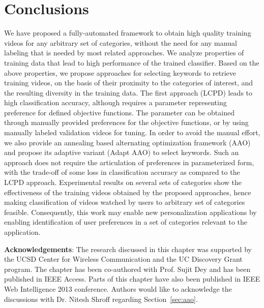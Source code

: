 \section{Conclusions}
\label{sec:conclusion}

We have proposed a fully-automated framework to obtain high quality training videos for any arbitrary set of categories, without the need for any manual labeling that is needed by most related approaches. We analyze properties of training data that lead to high performance of the trained classifier. Based on the above properties, we propose approaches for selecting keywords to retrieve training videos, on the basis of their proximity to the categories of interest, and the resulting diversity in the training data. The first approach (LCPD) leads to high classification accuracy, although requires a parameter representing preference for defined objective functions. The parameter can be obtained through manually provided preferences for the objective functions, or by using manually labeled validation videos for tuning. In order to avoid the manual effort, we also provide an annealing based alternating optimization framework (AAO) and propose its adaptive variant (Adapt AAO) to select keywords. Such an approach does not require the articulation of preferences in parameterized form, with the trade-off of some loss in classification accuracy as compared to the LCPD approach. Experimental results on several sets of categories show the effectiveness of the training videos obtained by the proposed approaches, hence making classification of videos watched by users to arbitrary set of categories feasible. Consequently, this work may enable new personalization applications by enabling identification of user preferences in a set of categories relevant to the application.

\textbf{Acknowledgements}: The research discussed in this chapter was supported by the UCSD Center for Wireless Communication and the UC Discovery Grant program. The chapter has been co-authored with Prof. Sujit Dey and has been published in IEEE Access. Parts of this chapter have also been published in IEEE Web Intelligence 2013 conference. Authors would like to acknowledge the discussions with Dr. Nitesh Shroff regarding Section~\ref{sec:aao}. 